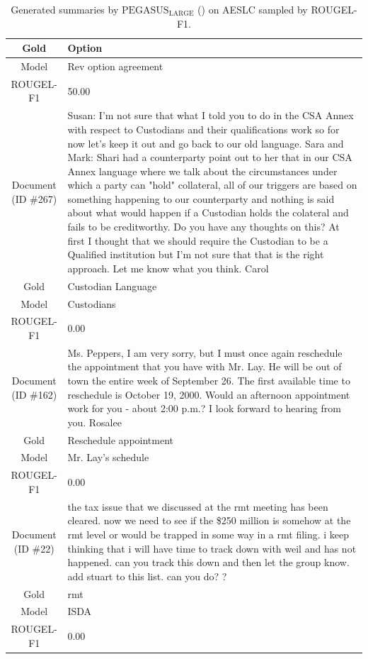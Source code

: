 \begin{table}[bth!]
\begin{tabular}{c|p{}}
\\ \hline
Gold & 
Option
\\ \hline
Model & 
Rev option agreement
\\ \hline
ROUGEL-F1 & 
50.00
\\ \hline
\makecell{Document\\(ID \#267)} & 
Susan: I'm not sure that what I told you to do in the CSA Annex with respect to Custodians and their qualifications work so for now let's keep it out and go back to our old language. Sara and Mark: Shari had a counterparty point out to her that in our CSA Annex language where we talk about the circumstances under which a party can "hold" collateral, all of our triggers are based on something happening to our counterparty and nothing is said about what would happen if a Custodian holds the colateral and fails to be creditworthy. Do you have any thoughts on this? At first I thought that we should require the Custodian to be a Qualified institution but I'm not sure that that is the right approach. Let me know what you think. Carol
\\ \hline
Gold & 
Custodian Language
\\ \hline
Model & 
Custodians
\\ \hline
ROUGEL-F1 & 
0.00
\\ \hline
\makecell{Document\\(ID \#162)} & 
Ms. Peppers, I am very sorry, but I must once again reschedule the appointment that you have with Mr. Lay. He will be out of town the entire week of September 26. The first available time to reschedule is October 19, 2000. Would an afternoon appointment work for you - about 2:00 p.m.? I look forward to hearing from you. Rosalee
\\ \hline
Gold & 
Reschedule appointment
\\ \hline
Model & 
Mr. Lay's schedule
\\ \hline
ROUGEL-F1 & 
0.00
\\ \hline
\makecell{Document\\(ID \#22)} & 
the tax issue that we discussed at the rmt meeting has been cleared. now we need to see if the \$250 million is somehow at the rmt level or would be trapped in some way in a rmt filing. i keep thinking that i will have time to track down with weil and has not happened. can you track this down and then let the group know. add stuart to this list. can you do? ?
\\ \hline
Gold & 
rmt
\\ \hline
Model & 
ISDA
\\ \hline
ROUGEL-F1 & 
0.00
\\ \hline
\end{tabular}
\caption{Generated summaries by $\text{PEGASUS}_{\text{LARGE}}$ (\gnews) on AESLC sampled by ROUGEL-F1.}
\end{table}
